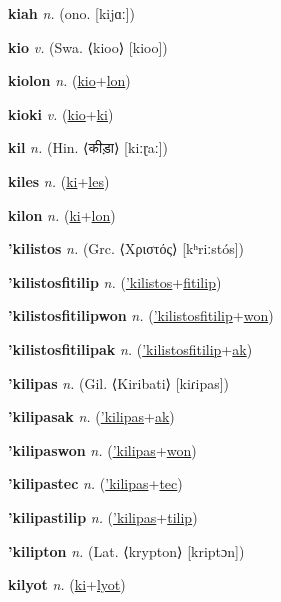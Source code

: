 \textbf{\hypertarget{kiah}{kiah}} \textit{n.} (ono. [kijɑː])


\textbf{\hypertarget{kio}{kio}} \textit{v.} (Swa. ⟨kioo⟩ [kioo])


\textbf{\hypertarget{kiolon}{kiolon}} \textit{n.} (\hyperlink{kio}{kio}+\allowbreak \hyperlink{lon}{lon})


\textbf{\hypertarget{kioki}{kioki}} \textit{v.} (\hyperlink{kio}{kio}+\allowbreak \hyperlink{ki}{ki})


\textbf{\hypertarget{kil}{kil}} \textit{n.} (Hin. ⟨{\devanagari{}कीड़ा}⟩ [kiːɽaː])


\textbf{\hypertarget{kiles}{kiles}} \textit{n.} (\hyperlink{ki}{ki}+\allowbreak \hyperlink{les}{les})


\textbf{\hypertarget{kilon}{kilon}} \textit{n.} (\hyperlink{ki}{ki}+\allowbreak \hyperlink{lon}{lon})


\textbf{\hypertarget{'kilistos}{'kilistos}} \textit{n.} (Grc. ⟨Χριστός⟩ [kʰriːstós])


\textbf{\hypertarget{'kilistosfitilip}{'kilistosfitilip}} \textit{n.} (\hyperlink{'kilistos}{'kilistos}+\allowbreak \hyperlink{fitilip}{fitilip})


\textbf{\hypertarget{'kilistosfitilipwon}{'kilistosfitilipwon}} \textit{n.} (\hyperlink{'kilistosfitilip}{'kilistosfitilip}+\allowbreak \hyperlink{won}{won})


\textbf{\hypertarget{'kilistosfitilipak}{'kilistosfitilipak}} \textit{n.} (\hyperlink{'kilistosfitilip}{'kilistosfitilip}+\allowbreak \hyperlink{ak}{ak})


\textbf{\hypertarget{'kilipas}{'kilipas}} \textit{n.} (Gil. ⟨Kiribati⟩ [kiɾipas])


\textbf{\hypertarget{'kilipasak}{'kilipasak}} \textit{n.} (\hyperlink{'kilipas}{'kilipas}+\allowbreak \hyperlink{ak}{ak})


\textbf{\hypertarget{'kilipaswon}{'kilipaswon}} \textit{n.} (\hyperlink{'kilipas}{'kilipas}+\allowbreak \hyperlink{won}{won})


\textbf{\hypertarget{'kilipastec}{'kilipastec}} \textit{n.} (\hyperlink{'kilipas}{'kilipas}+\allowbreak \hyperlink{tec}{tec})


\textbf{\hypertarget{'kilipastilip}{'kilipastilip}} \textit{n.} (\hyperlink{'kilipas}{'kilipas}+\allowbreak \hyperlink{tilip}{tilip})


\textbf{\hypertarget{'kilipton}{'kilipton}} \textit{n.} (Lat. ⟨krypton⟩ [kriptɔn])


\textbf{\hypertarget{kilyot}{kilyot}} \textit{n.} (\hyperlink{ki}{ki}+\allowbreak \hyperlink{lyot}{lyot})


